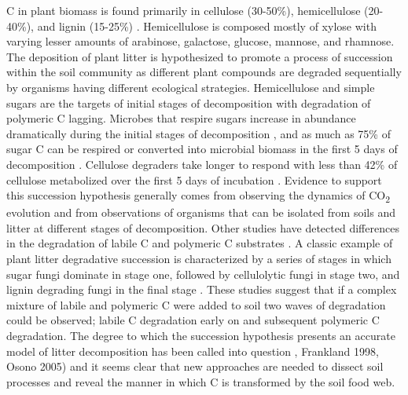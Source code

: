 C in plant biomass is found primarily in cellulose (30-50\%), hemicellulose (20-40\%), and lignin (15-25\%) \cite{Lynd_2002}. Hemicellulose is composed mostly of xylose with varying lesser amounts of arabinose, galactose, glucose, mannose, and rhamnose. The deposition of plant litter is hypothesized to promote a process of succession within the soil community as different plant compounds are degraded sequentially by organisms having different ecological strategies. Hemicellulose and simple sugars are the targets of initial stages of decomposition with degradation of polymeric C lagging. Microbes that respire sugars increase in abundance dramatically during the initial stages of decomposition \cite{GARRETT_1951,Alexander_1964}, and as much as 75\% of sugar C can be respired or converted into microbial biomass in the first 5 days of decomposition \cite{Engelking_2007}. Cellulose degraders take longer to respond \cite{Hu_1997} with less than 42\% of cellulose metabolized over the first 5 days of incubation \cite{Engelking_2007}. Evidence to support this succession hypothesis generally comes from observing the dynamics of CO\textsubscript{2} evolution and from observations of organisms that can be isolated from soils and litter at different stages of decomposition. Other studies have detected differences in the degradation of labile C and polymeric C substrates \cite{Engelking_2007,Anderson_1973,Stotzky_1961,Alden_2001,Furukawa_1996,Fontaine_2003,Blagodatskaya_2007,Jenkins_2010,Rui_2009,Fierer_2010}. A classic example of plant litter degradative succession is characterized by a series of stages in which sugar fungi dominate in stage one, followed by cellulolytic fungi in stage two, and lignin degrading fungi in the final stage \cite{Gessner_2010}. These studies suggest that if a complex mixture of labile and polymeric C were added to soil two waves of degradation could be observed; labile C degradation early on and subsequent polymeric C degradation. The degree to which the succession hypothesis presents an accurate model of litter decomposition has been called into question \cite{Kj_ller_1982}, Frankland 1998, Osono 2005) and it seems clear that new approaches are needed to dissect soil processes and reveal the manner in which C is transformed by the soil food web.  
 




